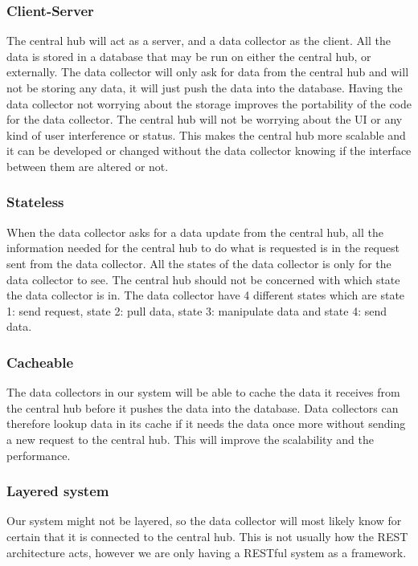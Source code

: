 \documentclass[../document.tex]{subfiles}
\begin{document}
\subsubsection{Client-Server}
The central hub will act as a server, and a data collector as the client. All the data is stored in a database that may be run on either the central hub, or externally. The data collector will only ask for data from the central hub and will not be storing any data, it will just push the data into the database. Having the data collector not worrying about the storage improves the portability of the code for the data collector. The central hub will not be worrying about the UI or any kind of user interference or status. This makes the central hub more scalable and it can be developed or changed without the data collector knowing if the interface between them are altered or not. 

\subsubsection{Stateless}
When the data collector asks for a data update from the central hub, all the information needed for the central hub to do what is requested is in the request sent from the data collector. All the states of the data collector is only for the data collector to see. The central hub should not be concerned with which state the data collector is in. The data collector have 4 different states which are state 1: send request, state 2: pull data, state 3: manipulate data and state 4: send data.

\subsubsection{Cacheable}
The data collectors in our system will be able to cache the data it receives from the central hub before it pushes the data into the database. Data collectors can therefore lookup data in its cache if it needs the data once more without sending a new request to the central hub. This will improve the scalability and the performance. 

\subsubsection{Layered system}
Our system might not be layered, so the data collector will most likely know for certain that it is connected to the central hub. This is not usually how the REST architecture acts, however we are only having a RESTful system as a framework. 
\end{document}
